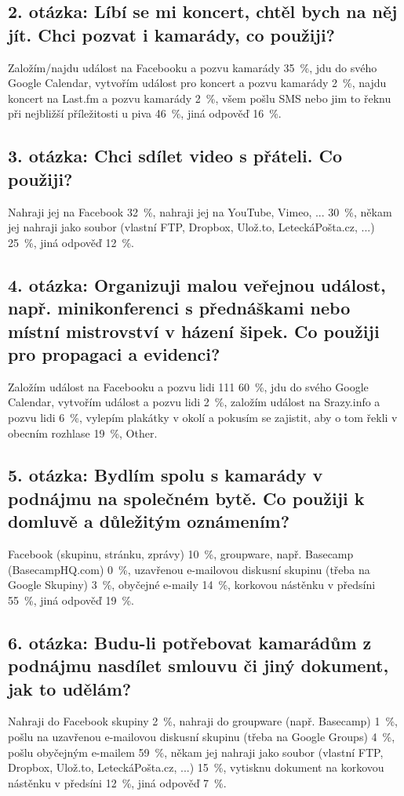 \documentclass[12pt,oneside,final]{fithesis2}
\begin{document}
\subsection*{2. otázka: Líbí se mi koncert, chtěl bych na něj jít. Chci pozvat i kamarády, co použiji?}
Založím/najdu událost na Facebooku a pozvu kamarády 35~\%,
jdu do svého Google Calendar, vytvořím událost pro koncert a pozvu kamarády  2~\%,
najdu koncert na Last.fm a pozvu kamarády  2~\%,
všem pošlu SMS nebo jim to řeknu při nejbližší příležitosti u piva 46~\%,
jiná odpověď 16~\%.

\subsection*{3. otázka: Chci sdílet video s přáteli. Co použiji?}
Nahraji jej na Facebook 32~\%,
nahraji jej na YouTube, Vimeo, ... 30~\%,
někam jej nahraji jako soubor (vlastní FTP, Dropbox, Ulož.to, LeteckáPošta.cz, ...) 25~\%,
jiná odpověď 12~\%.

\subsection*{4. otázka: Organizuji malou veřejnou událost, např. minikonferenci s přednáškami nebo místní mistrovství v házení šipek. Co použiji pro propagaci a evidenci?}
Založím událost na Facebooku a pozvu lidi 111 60~\%,
jdu do svého Google Calendar, vytvořím událost a pozvu lidi 2~\%,
založím událost na Srazy.info a pozvu lidi 6~\%,
vylepím plakátky v okolí a pokusím se zajistit, aby o tom řekli v obecním rozhlase 19~\%,
Other.

\subsection*{5. otázka: Bydlím spolu s kamarády v podnájmu na společném bytě. Co použiji k domluvě a důležitým oznámením?}
Facebook (skupinu, stránku, zprávy) 10~\%,
groupware, např. Basecamp (BasecampHQ.com) 0~\%,
uzavřenou e-mailovou diskusní skupinu (třeba na Google Skupiny) 3~\%,
obyčejné e-maily 14~\%,
korkovou nástěnku v předsíni 55~\%,
jiná odpověď 19~\%.

\subsection*{6. otázka: Budu-li potřebovat kamarádům z podnájmu nasdílet smlouvu či jiný dokument, jak to udělám?}
Nahraji do Facebook skupiny 2~\%,
nahraji do groupware (např. Basecamp) 1~\%,
pošlu na uzavřenou e-mailovou diskusní skupinu (třeba na Google Groups) 4~\%,
pošlu obyčejným e-mailem 59~\%,
někam jej nahraji jako soubor (vlastní FTP, Dropbox, Ulož.to, LeteckáPošta.cz, ...) 15~\%,
vytisknu dokument na korkovou nástěnku v předsíni 12~\%,
jiná odpověď 7~\%.
\end{document}
